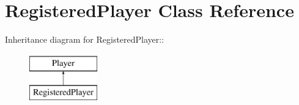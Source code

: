 \hypertarget{classRegisteredPlayer}{
\section{RegisteredPlayer Class Reference}
\label{classRegisteredPlayer}
}
Inheritance diagram for RegisteredPlayer::\begin{figure}[H]
\begin{center}
\leavevmode
\includegraphics[height=2cm]{classRegisteredPlayer}
\end{center}
\end{figure}
